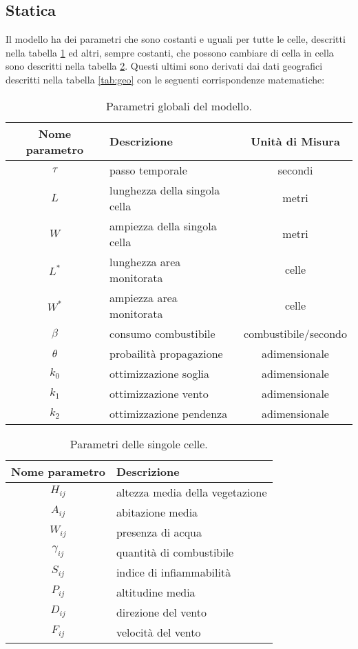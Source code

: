 \documentclass[draft]{article}
\begin{document}
\subsection{Statica}

Il modello ha dei parametri che sono costanti e uguali per tutte le celle,
descritti nella tabella \ref{tab:globals} ed altri, sempre costanti, che possono
cambiare di cella in cella sono descritti nella tabella \ref{tab:params}. Questi
ultimi sono derivati dai dati geografici descritti nella tabella \ref{tab:geo}
con le seguenti corrispondenze matematiche:

\begin{table}
\centering
\begin{tabular}{|c|l|c|}
	\hline
	\textbf{Nome parametro} & \textbf{Descrizione} & \textbf{Unità di Misura}\\
	\hline
	$\tau$ & passo temporale & secondi\\
	$L$ & lunghezza della singola cella & metri\\
	$W$ & ampiezza della singola cella & metri\\
	$L^*$ & lunghezza area monitorata & celle\\
	$W^*$ & ampiezza area monitorata & celle\\
	$\beta$ & consumo combustibile & combustibile/secondo\\
	$\theta$ & probailità propagazione & adimensionale\\
	$k_0$ & ottimizzazione soglia & adimensionale\\
	$k_1$ & ottimizzazione vento & adimensionale\\
	$k_2$ & ottimizzazione pendenza & adimensionale\\
	\hline
\end{tabular}
\caption{Parametri globali del modello.}
\label{tab:globals}
\end{table}

\begin{table}
\centering
\begin{tabular}{|c|l|}
	\hline
	\textbf{Nome parametro} & \textbf{Descrizione}\\
	\hline
	$H_{ij}$ & altezza media della vegetazione\\
	$A_{ij}$ & abitazione media\\
	$W_{ij}$ & presenza di acqua\\
	$\gamma_{ij}$ & quantità di combustibile\\ %
	$S_{ij}$ & indice di infiammabilità\\
	$P_{ij}$ & altitudine media\\
	$D_{ij}$ & direzione del vento\\
	$F_{ij}$ & velocità del vento\\
	\hline
\end{tabular}
\caption{Parametri delle singole celle.}
\label{tab:params}
\end{table}
\end{document}
